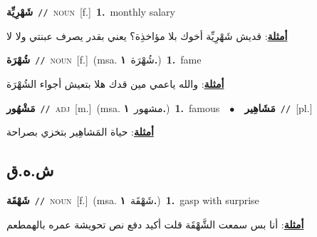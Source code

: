 \documentclass[10pt,a4paper,twoside]{article} %
\begin{document}
\begin{multicols}{2}
{\setlength\topsep{0pt}\textbf{\foreignlanguage{arabic}{شَهْرِيِّة}}\ {\color{gray}\texttt{//}\color{black}}\ \textsc{noun}\ [f.]\ \textbf{1.}~monthly salary\  \begin{flushright}\color{gray}\foreignlanguage{arabic}{\textbf{\underline{\foreignlanguage{arabic}{أمثلة}}}: قديش شَهْرِيِّة أخوك بلا مؤاخذِة؟ يعني بقدر يصرف عبنتي ولا لا}\end{flushright}\color{black}} \vspace{2mm}

{\setlength\topsep{0pt}\textbf{\foreignlanguage{arabic}{شُهْرَة}}\ {\color{gray}\texttt{//}\color{black}}\ \textsc{noun}\ [f.]\ \color{gray}(msa. \foreignlanguage{arabic}{شُهْرَة}~\foreignlanguage{arabic}{\textbf{١.}})\color{black}\ \textbf{1.}~fame\  \begin{flushright}\color{gray}\foreignlanguage{arabic}{\textbf{\underline{\foreignlanguage{arabic}{أمثلة}}}: والله ياعمي مين قدك هلا بتعيش أجواء الشُهْرَة}\end{flushright}\color{black}} \vspace{2mm}

{\setlength\topsep{0pt}\textbf{\foreignlanguage{arabic}{مَشْهُور}}\ {\color{gray}\texttt{//}\color{black}}\ \textsc{adj}\ [m.]\ \color{gray}(msa. \foreignlanguage{arabic}{مشهور}~\foreignlanguage{arabic}{\textbf{١.}})\color{black}\ \textbf{1.}~famous\ \ $\bullet$\ \ \setlength\topsep{0pt}\textbf{\foreignlanguage{arabic}{مَشَاهِير}}\ {\color{gray}\texttt{//}\color{black}}\ [pl.]\  \begin{flushright}\color{gray}\foreignlanguage{arabic}{\textbf{\underline{\foreignlanguage{arabic}{أمثلة}}}: حياة المَشاهِير بتخزي بصراحة}\end{flushright}\color{black}} \vspace{2mm}

\vspace{-3mm}
\subsection*{\color{blue}\foreignlanguage{arabic}{ش.ه.ق}\color{blue}{}} 

{\setlength\topsep{0pt}\textbf{\foreignlanguage{arabic}{شَهْقَة}}\ {\color{gray}\texttt{//}\color{black}}\ \textsc{noun}\ [f.]\ \color{gray}(msa. \foreignlanguage{arabic}{شَهْقَة}~\foreignlanguage{arabic}{\textbf{١.}})\color{black}\ \textbf{1.}~gasp with surprise\  \begin{flushright}\color{gray}\foreignlanguage{arabic}{\textbf{\underline{\foreignlanguage{arabic}{أمثلة}}}: أنا بس سمعت الشَّهْقَة قلت أكيد دفع نص تحويشة عمره بالهمطعم}\end{flushright}\color{black}} \vspace{2mm}


\end{multicols}
\end{document}
